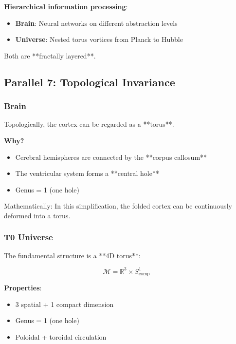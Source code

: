 	\begin{keyresult}
		\textbf{Hierarchical information processing}:

		\begin{itemize}
			\item \textbf{Brain}: Neural networks on different abstraction levels
			\item \textbf{Universe}: Nested torus vortices from Planck to Hubble
		\end{itemize}

		Both are **fractally layered**.
	\end{keyresult}

	\subsection{Parallel 7: Topological Invariance}

	\subsubsection{Brain}

	Topologically, the cortex can be regarded as a **torus**.

	\textbf{Why?}
	\begin{itemize}
		\item Cerebral hemispheres are connected by the **corpus callosum**
		\item The ventricular system forms a **central hole**
		\item Genus = 1 (one hole)
	\end{itemize}

	Mathematically: In this simplification, the folded cortex can be continuously deformed into a torus.

	\subsubsection{T0 Universe}

	The fundamental structure is a **4D torus**:

	\begin{equation}
		\mathcal{M} = \mathbb{R}^3 \times S^1_{\text{comp}}
	\end{equation}

	\textbf{Properties}:
	\begin{itemize}
		\item 3 spatial + 1 compact dimension
		\item Genus = 1 (one hole)
		\item Poloidal + toroidal circulation
	\end{itemize}

